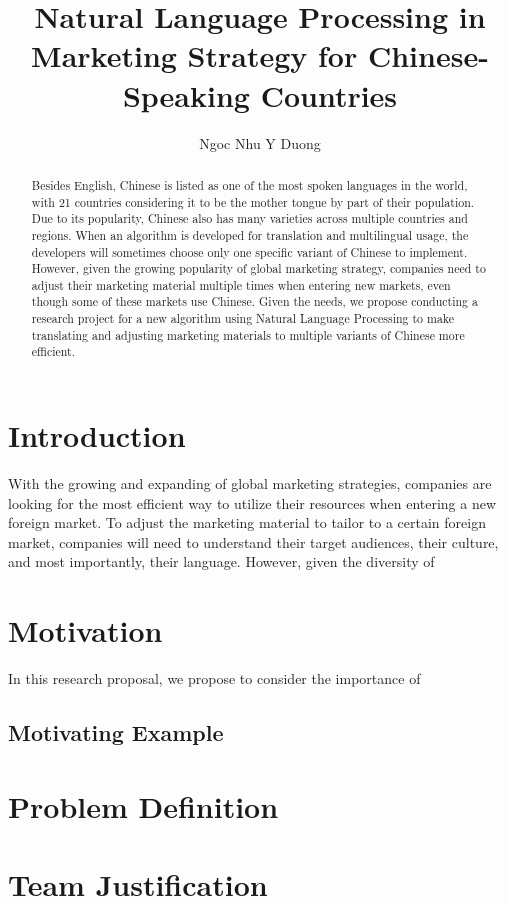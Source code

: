\documentclass[sigconf]{acmart}
\begin{document}
\title{Natural Language Processing in Marketing Strategy for Chinese-Speaking Countries}
\author{Ngoc Nhu Y Duong}

\begin{abstract}
Besides English, Chinese is listed as one of the most spoken languages in the world, with 21 countries considering it to be the mother tongue by part of their population. Due to its popularity, Chinese also has many varieties across multiple countries and regions. When an algorithm is developed for translation and multilingual usage, the developers will sometimes choose only one specific variant of Chinese to implement. However, given the growing popularity of global marketing strategy, companies need to adjust their marketing material multiple times when entering new markets, even though some of these markets use Chinese. Given the needs, we propose conducting a research project for a new algorithm using Natural Language Processing to make translating and adjusting marketing materials to multiple variants of Chinese more efficient.
\end{abstract}

\maketitle

\section{Introduction}
With the growing and expanding of global marketing strategies, companies are looking for the most efficient way to utilize their resources when entering a new foreign market. To adjust the marketing material to tailor to a certain foreign market, companies will need to understand their target audiences, their culture, and most importantly, their language. However, given the diversity of 

\section{Motivation}
In this research proposal, we propose to consider the importance of 
\subsection{Motivating Example}

\section{Problem Definition}

\section{Team Justification} 
\end{document}

